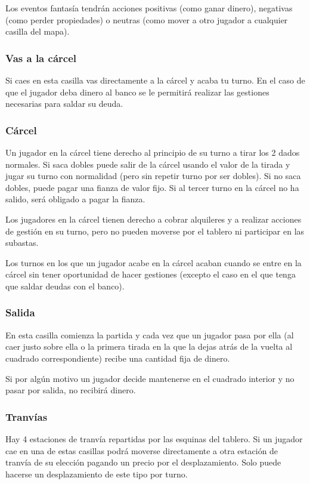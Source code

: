 Los eventos fantasía tendrán acciones positivas (como ganar dinero),
negativas (como perder propiedades) o neutras (como mover a otro 
jugador a cualquier casilla del mapa).

\subsubsection{Vas a la cárcel}
Si caes en esta casilla vas directamente a la cárcel y acaba tu turno.
En el caso de que el jugador deba dinero al banco se le permitirá realizar
las gestiones necesarias para saldar su deuda.

\subsubsection{Cárcel}
Un jugador en la cárcel tiene derecho al principio de su turno a 
tirar los 2 dados normales. Si saca dobles puede salir de la cárcel usando 
el valor de la tirada y jugar su turno con normalidad (pero sin repetir turno por ser dobles).
Si no saca dobles, puede pagar una fianza de valor fijo. 
Si al tercer turno en la cárcel no ha 
salido, será obligado a pagar la fianza.

Los jugadores en la cárcel tienen derecho a cobrar alquileres y a realizar
acciones de gestión en su turno, pero no pueden moverse por el tablero ni
participar en las subastas.

Los turnos en los que un jugador acabe en la cárcel acaban cuando se 
entre en la cárcel sin tener oportunidad de hacer gestiones (excepto
el caso en el que tenga que saldar deudas con el banco).

\subsubsection{Salida}
En esta casilla comienza la partida y cada vez que un jugador pasa por
ella (al caer justo sobre ella o la primera tirada en la que la dejas atrás
de la vuelta al cuadrado correspondiente) 
recibe una cantidad fija de dinero. 

Si por algún motivo un jugador 
decide mantenerse en el cuadrado interior y no pasar por salida, no recibirá
dinero.

\subsubsection{Tranvías}
Hay 4 estaciones de tranvía repartidas por las esquinas del tablero. 
Si un jugador cae en una de estas casillas podrá moverse directamente a otra 
estación de tranvía de su elección pagando un precio por el desplazamiento.
Solo puede hacerse un desplazamiento de este tipo por turno.


